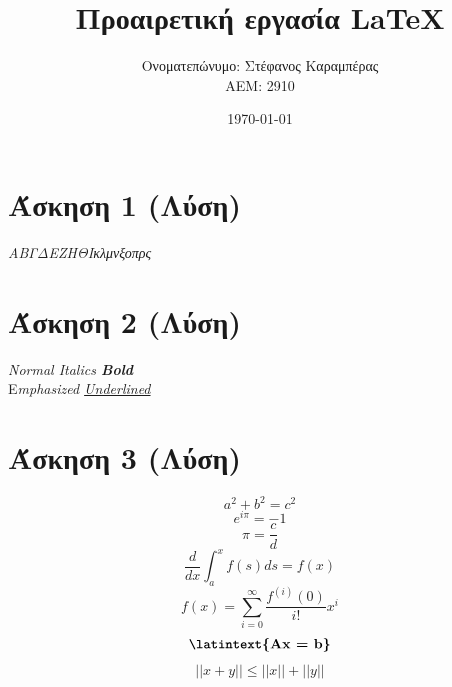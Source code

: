 \documentclass[a4paper,11pt]{article}
\title{Προαιρετική εργασία \lt LaTeX} %
\author{Ονοματεπώνυμο: Στέφανος Καραμπέρας  \\  ΑΕΜ: 2910}       %
\date{\today}                                      %
\newcommand{\lt}{\latintext}
\begin{document}

\maketitle

\section{Άσκηση 1 (Λύση)}
	
	\begin{center}
		\emph{{\tiny Α}{\scriptsize Β}{\footnotesize Γ}{\small Δ}{\normalsize Ε}{\large Ζ}{\Large Η}{\LARGE Θ}{\huge Ι}{\huge κ}{\LARGE λ}{\Large μ}{\large ν}{\normalsize ξ}{\small ο}{\footnotesize π}{\scriptsize ρ}{\tiny ς}}
	\end{center}

\vspace{20pt}

\section{Άσκηση 2 (Λύση)}

	\begin{center}	
		\lt
		\textit{Normal Italics \textbf{Bold\\}}
		{E}\textit{mphasized \underline{Underlined}}
	\end{center}

\section{Άσκηση 3 (Λύση)}
	
	\begin{equation*}
	a^2 + b^2 = c^2
	\end{equation*}
	\begin{equation*}
	e^{i\pi} = -1
	\end{equation*}
	\begin{equation*}
	\pi = \frac{c}{d}
	\end{equation*}
	\begin{equation*}
	\dfrac{d}{dx}\int_{a}^{x} f(s) ds = f(x)
	\end{equation*}
	\begin{equation*}
	f(x) = \sum_{i=0}^{\infty } {\dfrac{f^{(i)}(0)}{i!} x^i }
	\end{equation*}
	\begin{equation*}
	\textbf{\lt{Ax = b}}
	\end{equation*}
	\begin{equation*}
	||{x+y}||\leq||x||+||y||
	\end{equation*}
	
\end{document}
